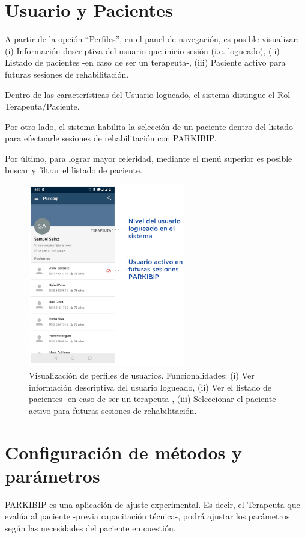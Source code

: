 \section{Usuario y Pacientes}

A partir de la opción ``Perfiles'', en el panel de navegación, es posible visualizar: (i) Información descriptiva del usuario que inicio sesión (i.e. logueado), (ii) Listado de pacientes -en caso de ser un terapeuta-, (iii) Paciente activo para futuras sesiones de rehabilitación.

Dentro de las características del Usuario logueado, el sistema distingue el Rol Terapeuta/Paciente.

Por otro lado, el sistema habilita la selección de un paciente dentro del listado para efectuarle sesiones de rehabilitación con PARKIBIP.

Por último, para lograr mayor celeridad, mediante el menú superior es posible buscar y filtrar el listado de paciente.
\newpage

\begin{figure}[H]
 \centering
 \includegraphics[height=8cm]{TESIS/imagenes/user-manual/manual-users.PNG}
 \caption{Visualización de perfiles de usuarios. Funcionalidades: (i) Ver información descriptiva del usuario logueado, (ii) Ver el listado de pacientes -en caso de ser un terapeuta-, (iii) Seleccionar el paciente activo para futuras sesiones de rehabilitación.}
 \label{fig:manual-users}
\end{figure}

\section{Configuración de métodos y parámetros}

PARKIBIP es una aplicación de ajuste experimental. Es decir, el Terapeuta que evalúa al paciente -previa capacitación técnica-, podrá ajustar los parámetros según las necesidades del paciente en cuestión.

